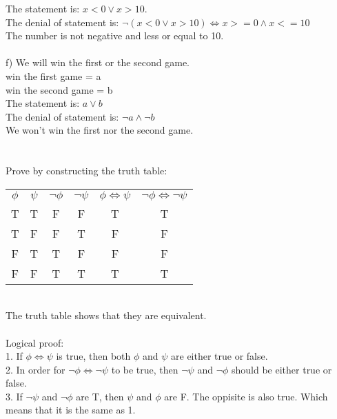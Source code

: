 \documentclass{article}
\begin{document}
The statement is: $x < 0 \vee x > 10$. \\
The denial of statement is: $\neg (x < 0 \vee x > 10) \Leftrightarrow x >= 0 \wedge x <= 10$ \\
The number is not negative and less or equal to 10.\\
\\
f) We will win the first or the second game. \\
win the first game = a \\
win the second game = b \\
The statement is: $a \vee b$ \\
The denial of statement is: $\neg a \wedge \neg b$ \\
We won't win the first nor the second game. \\

\section{}
Prove by constructing the truth table: \\
\begin{tabular}{ c c c c c c }
  $\phi$ & $\psi$ & $\neg\phi$ & $\neg\psi$ & $\phi \Leftrightarrow \psi$ & $\neg \phi \Leftrightarrow \neg \psi$ \\
  T      & T      & F          & F          & T                           & T                                       \\
  T      & F      & F          & T          & F                           & F                                        \\
  F      & T      & T          & F          & F                           & F                                        \\
  F      & F      & T          & T          & T                           & T                                        \\
\end{tabular} \\
The truth table shows that they are equivalent. \\
\\
Logical proof: \\
1. If $\phi \Leftrightarrow \psi$ is true, then both $\phi$ and $\psi$ are either true or false. \\
2. In order for $\neg\phi \Leftrightarrow \neg\psi$ to be true, then $\neg\psi$ and $\neg\phi$ should be either true or false. \\
3. If $\neg\psi$ and $\neg\phi$ are T, then $\psi$ and $\phi$ are F. The oppisite is also true. Which means that it is the same as 1.\\
\end{document}
